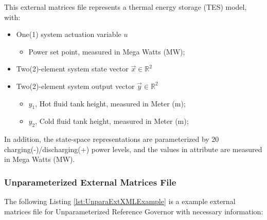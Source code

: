 This external matrices file represents a thermal energy storage (TES) model, with:
\begin{itemize}
  \item One(1) system actuation variable \begin{math} u \end{math}
  \begin{itemize}
    \item Power set point, measured in Mega Watts (MW);
  \end{itemize}
  \item Two(2)-element system state vector \begin{math} \overrightarrow{x}\in\mathbb{R}^2 \end{math}
  \item Two(2)-element system output vector \begin{math} \overrightarrow{y}\in\mathbb{R}^2 \end{math}
  \begin{itemize}
    \item \begin{math} y_1 \end{math}, Hot fluid tank height, measured in Meter (m);
    \item \begin{math} y_2 \end{math}, Cold fluid tank height, measured in Meter (m);
  \end{itemize}
\end{itemize}

In addition, the state-space representations are parameterized by 20 charging(-)/discharging(+) power levels, 
and the values in  attribute are measured in Mega Watts (MW).

\subsubsection{Unparameterized External Matrices File}
\label{UnparaExtMatFile}
The following Listing \ref{lst:UnparaExtXMLExample} is a example external matrices file for Unparameterized Reference 
Governor with necessary information:

